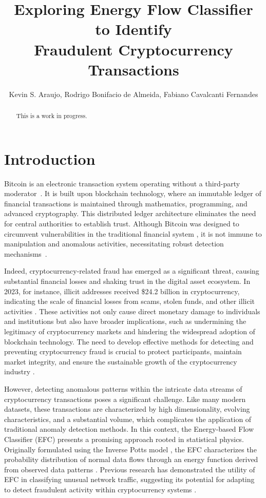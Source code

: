\documentclass[12pt]{article}
\title{Exploring Energy Flow Classifier to Identify \\ Fraudulent Cryptocurrency Transactions}
\author{Kevin S. Araujo\inst{1}, Rodrigo Bonifacio de Almeida\inst{1}, 
  Fabiano Cavalcanti Fernandes\inst{2} }
\begin{document}
 

\maketitle

\begin{abstract}
  This is a work in progress.
\end{abstract}

\section{Introduction} \label{sec:introduction}
Bitcoin is an electronic transaction system operating without a third-party moderator~\cite{nakamoto2008bitcoin}. It is built
upon blockchain technology, where an immutable ledger of financial transactions is maintained through mathematics, programming,
and advanced cryptography. This distributed ledger architecture eliminates the need for central authorities to establish trust.
Although Bitcoin was designed to circumvent vulnerabilities in the traditional financial system \cite{nakamoto2008bitcoin},
it is not immune to manipulation and anomalous activities, necessitating robust detection mechanisms~\cite{fang2022cryptocurrency,
zhang2020financial,zainal2018review}. 

Indeed, cryptocurrency-related fraud has emerged as a significant threat, causing substantial financial losses and shaking
trust in the digital asset ecosystem. In 2023, for instance, illicit addresses received \$24.2 billion in cryptocurrency,
indicating the scale of financial losses from scams, stolen funds, and other illicit activities \cite{chainalysis2024cryptocrime}.
These activities not only cause direct monetary damage to individuals and institutions but also have broader implications,
such as undermining the legitimacy of cryptocurrency markets and hindering the widespread adoption of blockchain technology.
The need to develop effective methods for detecting and preventing cryptocurrency fraud is crucial to protect participants,
maintain market integrity, and ensure the sustainable growth of the cryptocurrency industry \cite{scharfman2024, Khiari2025}.

However, detecting anomalous patterns within the intricate data streams of cryptocurrency transactions poses a significant
challenge. Like many modern datasets, these transactions are characterized by high dimensionality, evolving characteristics,
and a substantial volume, which complicates the application of traditional anomaly detection methods. In this context, the
Energy-based Flow Classifier (EFC) presents a promising approach rooted in statistical physics. Originally formulated using
the Inverse Potts model \cite{pontes2019}, the EFC characterizes the probability distribution of normal data flows through
an energy function derived from observed data patterns \cite{pontes2019}. Previous research has demonstrated the utility
of EFC in classifying unusual network traffic, suggesting its potential for adapting to detect fraudulent activity within
cryptocurrency systems \cite{pontes2019, souza2022novelopensetenergybased}.
\end{document}
